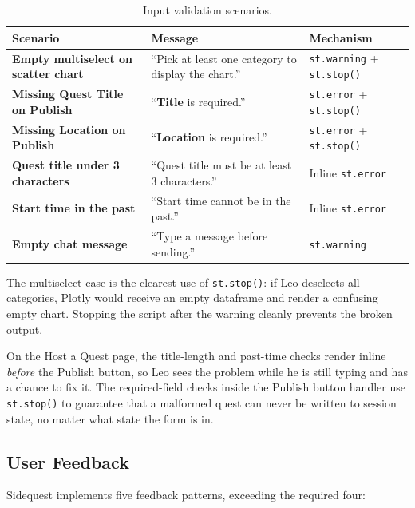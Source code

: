 \documentclass[11pt]{article}
\begin{document}
\begin{table}[h!]
\centering
\begin{tabularx}{\textwidth}{>{\bfseries}l X l}
\toprule
Scenario & Message & Mechanism \\
\midrule
Empty multiselect on scatter chart & ``Pick at least one category to display the chart.'' & \texttt{st.warning} + \texttt{st.stop()} \\
\addlinespace
Missing Quest Title on Publish & ``\textbf{Title} is required.'' & \texttt{st.error} + \texttt{st.stop()} \\
\addlinespace
Missing Location on Publish & ``\textbf{Location} is required.'' & \texttt{st.error} + \texttt{st.stop()} \\
\addlinespace
Quest title under 3 characters & ``Quest title must be at least 3 characters.'' & Inline \texttt{st.error} \\
\addlinespace
Start time in the past & ``Start time cannot be in the past.'' & Inline \texttt{st.error} \\
\addlinespace
Empty chat message & ``Type a message before sending.'' & \texttt{st.warning} \\
\bottomrule
\end{tabularx}
\caption{Input validation scenarios.}
\end{table}

The multiselect case is the clearest use of \texttt{st.stop()}: if Leo deselects all categories, Plotly would receive an empty dataframe and render a confusing empty chart. Stopping the script after the warning cleanly prevents the broken output.

On the Host a Quest page, the title-length and past-time checks render inline \textit{before} the Publish button, so Leo sees the problem while he is still typing and has a chance to fix it. The required-field checks inside the Publish button handler use \texttt{st.stop()} to guarantee that a malformed quest can never be written to session state, no matter what state the form is in.

\subsection{User Feedback}

Sidequest implements five feedback patterns, exceeding the required four:
\end{document}
